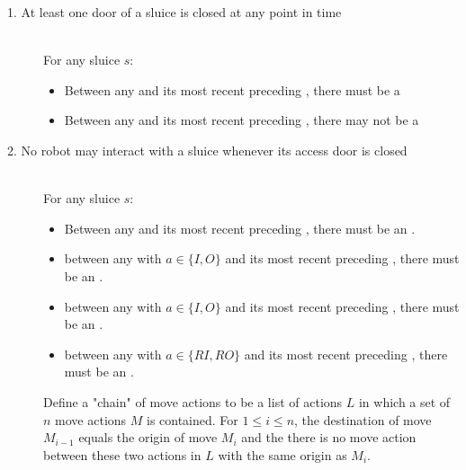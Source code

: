 
\begin{description}
 \item[1. At least one door of a sluice is closed at any point in time] \hfill \\
 For any sluice $s$:
 \begin{itemize}
  \item Between any  and its most recent preceding , there must be a 
  \item Between any  and its most recent preceding , there may not be a 
 \end{itemize}

 \item[2. No robot may interact with a sluice whenever its access door is closed] \hfill \\
For any sluice $s$:

\begin{itemize}
	\item Between any  and its most recent preceding , there must be an .
	\item between any  with $a \in \{ I, O \}$ and its most recent preceding , there must be an .
	\item between any  with $a \in \{ I, O \}$ and its most recent preceding , there must be an .
	\item between any  with $a \in \{ RI, RO \}$ and its most recent preceding , there must be an .
\end{itemize}
 
 \item[] \hfill 
 
 Define a "chain" of move actions to be a list of actions $L$  in which a set of $n$ move actions $M$ is contained. For $1 \leq i \leq n$, the destination of move $M_{i-1}$ equals the origin of move $M_{i}$ and the there is no move action between these two actions in $L$ with the same origin as $M_{i}$.
 

\end{description}
